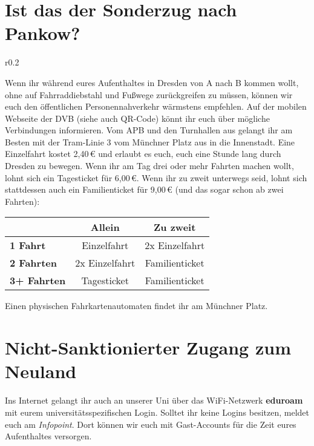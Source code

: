 \section*{Ist das der Sonderzug nach Pankow?}

\begin{wrapfigure}[6]{r}{0.2\textwidth}
  \vspace*{-11pt}
  \textcolor{KIFgrey}{}
\end{wrapfigure}

Wenn ihr während eures Aufenthaltes in Dresden von A nach B kommen wollt, ohne auf Fahrraddiebstahl und Fußwege zurückgreifen zu müssen, können wir euch den öffentlichen Personennahverkehr wärmstens empfehlen.
Auf der mobilen Webseite der DVB  (siehe auch QR-Code) könnt ihr euch über mögliche Verbindungen informieren.
Vom APB und den Turnhallen aus gelangt ihr am Besten mit der Tram-Linie 3 vom Münchner Platz aus in die Innenstadt.
Eine Einzelfahrt kostet 2,40\,€ und erlaubt es euch, euch eine Stunde lang durch Dresden zu bewegen. Wenn ihr am Tag drei oder mehr Fahrten machen wollt, lohnt sich ein Tagesticket für 6,00\,€. Wenn ihr zu zweit unterwegs seid, lohnt sich stattdessen auch ein Familienticket für 9,00\,€ (und das sogar schon ab zwei Fahrten):

\begin{center}
\begin{tabular}{l | c | c}
& \textbf{Allein} & \textbf{Zu zweit} \\ \hline
\textbf{1 Fahrt} & Einzelfahrt & 2x Einzelfahrt \\ \hline
\textbf{2 Fahrten} & 2x Einzelfahrt & Familienticket \\ \hline
\textbf{3+ Fahrten} & Tagesticket & Familienticket \\
\end{tabular}
\end{center}

Einen physischen Fahrkartenautomaten findet ihr am Münchner Platz.

\section*{Nicht-Sanktionierter Zugang zum Neuland}

Ins Internet gelangt ihr auch an unserer Uni über das WiFi-Netzwerk \textbf{eduroam} mit eurem universitätsspezifischen Login.
Solltet ihr keine Logins besitzen, meldet euch am \emph{Infopoint}.
Dort können wir euch mit Gast-Accounts für die Zeit eures Aufenthaltes versorgen.

